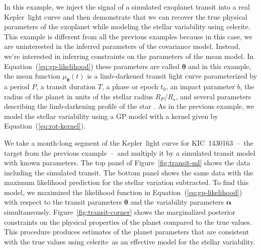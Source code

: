 \documentclass[manuscript, letterpaper]{aastex6}
\makeatletter
\let\origsubsection\subsection
\renewcommand\subsection{\@ifstar{\starsubsection}{\nostarsubsection}}
\newcommand\nostarsubsection[1]{\subsectionprelude\origsubsection{#1}}
\newcommand\starsubsection[1]{\subsectionprelude\origsubsection*{#1}}
\newcommand\subsectionprelude{\vspace{1em}}
\newcommand{\project}[1]{\textsf{#1}}
\newcommand{\kepler}{\project{Kepler}}
\newcommand{\celerite}{\project{celerite}}
\newcommand{\figureref}[1]{\ref{fig:#1}}
\newcommand{\Figure}[1]{Figure~\figureref{#1}}
\renewcommand{\eqref}[1]{\ref{eq:#1}}
\newcommand{\Eq}[1]{Equation~(\eqref{#1})}
\newcommand{\eq}[1]{\Eq{#1}}
\newcommand{\bvec}[1]{{\ensuremath{\boldsymbol{#1}}}}
\makeatother
\begin{document}
\subsection{Exoplanet transit fitting}

In this example, we inject the signal of a simulated exoplanet transit into a
real \kepler\ light curve and then demonstrate that we can recover the true
physical parameters of the exoplanet while modeling the stellar variability
using \celerite.
This example is different from all the previous examples because in this case,
we are uninterested in the inferred parameters of the covariance model.
Instead, we're interested in inferring constraints on the parameters of the
mean model.
In \eq{gp-likelihood} these parameters are called $\bvec{\theta}$ and in this
example, the mean function $\mu_\bvec{\theta}(t)$ is a limb-darkened transit
light curve \citep{Mandel:2002} parameterized by a period $P$, a transit
duration $T$, a phase or epoch $t_0$, an impact parameter $b$, the radius
of the planet in units of the stellar radius $R_P/R_\star$, and several
parameters describing the limb-darkening profile of the star \citep{Claret:2011}.
As in the previous example, we model the stellar variability using a GP model
with a kernel given by \eq{rot-kernel}.

We take a month-long segment of the \kepler\ light curve for
KIC~1430163~--~the target from the previous example~--~and multiply it by a
simulated transit model with known parameters.
The top panel of \Figure{transit-ml} shows the data including the simulated
transit.
The bottom panel shows the same data with the maximum likelihood prediction
for the stellar variation subtracted.
To find this model, we maximized the likelihood function in \eq{gp-likelihood}
with respect to the transit parameters $\bvec{\theta}$ and the variability
parameters $\bvec{\alpha}$ simultaneously.
\Figure{transit-corner} shows the marginalized posterior constraints on the
physical properties of the planet compared to the true values.
This procedure produces estimates of the planet parameters that are consistent
with the true values using \celerite\ as an effective model for the stellar
variability.
\end{document}
